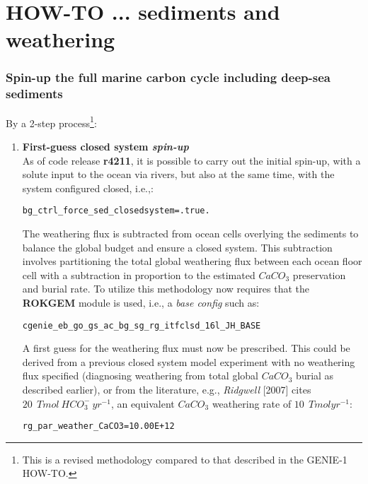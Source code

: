 \documentclass[11pt,fleqn]{book} %
\begin{document}
\section{HOW-TO ... sediments and weathering}

%
\subsubsection{Spin-up the full marine carbon cycle including deep-sea sediments}\label{Spin-up the full marine carbon cycle including sediments}

\vspace{1mm}
By a 2-step process\footnote{This is a revised methodology compared to that described in the GENIE-1 HOW-TO.}:

\begin{enumerate}

\vspace{1mm}
\item \textbf{First-guess closed system \textit{spin-up}}
\\As of code release \textbf{r4211}, it is possible to carry out the initial spin-up, with a solute input to the ocean via rivers, but also at the same time, with the system configured closed, i.e.,:
\vspace{-1mm}\begin{verbatim}bg_ctrl_force_sed_closedsystem=.true.\end{verbatim}\vspace{-1mm}
The weathering flux is subtracted from ocean cells overlying the sediments to balance the global budget and ensure a closed system. This subtraction involves partitioning the total global weathering flux between each ocean floor cell with a subtraction in proportion to the estimated \(CaCO_{3}\) preservation and burial rate. To utilize this methodology now requires that the \textbf{ROKGEM} module is used, i.e., a \textit{base config} such as:
\vspace{-1mm}\begin{verbatim}cgenie_eb_go_gs_ac_bg_sg_rg_itfclsd_16l_JH_BASE\end{verbatim}\vspace{-1mm}
A first guess for the weathering flux must now be prescribed. This could be derived from a previous closed system model experiment with no weathering flux specified (diagnosing weathering from total global \(CaCO_{3}\) burial as described earlier), or from the literature, e.g., \textit{Ridgwell} [2007] cites \(20\:\ Tmol \:HCO^{-}_{3} \:yr^{-1}\), an equivalent \(CaCO_{3}\) weathering rate of \(10\:\ Tmol yr^{-1}\):
\vspace{-1mm}\begin{verbatim}rg_par_weather_CaCO3=10.00E+12\end{verbatim}\vspace{-1mm}


\end{enumerate}
\end{document}
